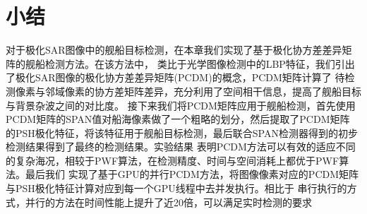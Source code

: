 \section{小结}
    对于极化SAR图像中的舰船目标检测，在本章我们实现了基于极化协方差差异矩阵的舰船检测方法。在该方法中，
    类比于光学图像检测中的LBP特征，我们引出了极化SAR图像的极化协方差差异矩阵(PCDM)的概念，PCDM矩阵计算了
    待检测像素与邻域像素的协方差矩阵差异，充分利用了空间相干信息，提高了舰船目标与背景杂波之间的对比度。
    接下来我们将PCDM矩阵应用于舰船检测，首先使用PCDM矩阵的SPAN值对船海像素做了一个粗略的划分，然后提取了PCDM矩阵
    的PSH极化特征，将该特征用于舰船目标检测，最后联合SPAN检测器得到的初步检测结果得到了最终的检测结果。实验结果
    表明PCDM方法可以有效的适应不同的复杂海况，相较于PWF算法，在检测精度、时间与空间消耗上都优于PWF算法。最后我们
    实现了基于GPU的并行PCDM方法，将图像像素对应的PCDM矩阵与PSH极化特征计算对应到每一个GPU线程中去并发执行。相比于
    串行执行的方式，并行的方法在时间性能上提升了近20倍，可以满足实时检测的要求


